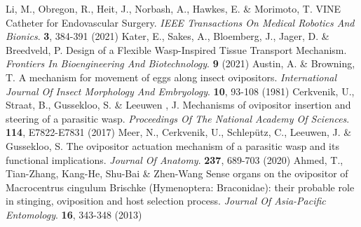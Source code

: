 \documentclass[letterpaper, 10 pt, conference]{ieeeconf}  %
\begin{document}
\begin{thebibliography}{99}
Li, M., Obregon, R., Heit, J., Norbash, A., Hawkes, E. \& Morimoto, T. VINE Catheter for Endovascular Surgery. {\em IEEE Transactions On Medical Robotics And Bionics}. \textbf{3}, 384-391 (2021)
 Kater, E., Sakes, A., Bloemberg, J., Jager, D. \& Breedveld, P. Design of a Flexible Wasp-Inspired Tissue Transport Mechanism. {\em Frontiers In Bioengineering And Biotechnology}. \textbf{9} (2021)
Austin, A. \& Browning, T. A mechanism for movement of eggs along insect ovipositors. {\em International Journal Of Insect Morphology And Embryology}. \textbf{10}, 93-108 (1981)
Cerkvenik, U., Straat, B., Gussekloo, S. \& Leeuwen , J. Mechanisms of ovipositor insertion and steering of a parasitic wasp. {\em Proceedings Of The National Academy Of Sciences}. \textbf{114}, E7822-E7831 (2017)
Meer, N., Cerkvenik, U., Schlepütz, C., Leeuwen, J. \& Gussekloo, S. The ovipositor actuation mechanism of a parasitic wasp and its functional implications. {\em Journal Of Anatomy}. \textbf{237}, 689-703 (2020)
Ahmed, T., Tian-Zhang, Kang-He, Shu-Bai \& Zhen-Wang Sense organs on the ovipositor of Macrocentrus cingulum Brischke (Hymenoptera: Braconidae): their probable role in stinging, oviposition and host selection process. {\em Journal Of Asia-Pacific Entomology}. \textbf{16}, 343-348 (2013)
\end{thebibliography}
\end{document}
